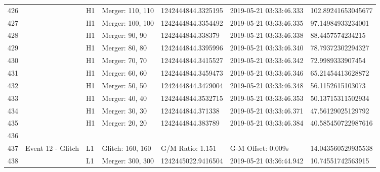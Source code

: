 \begin{longtable}{lllllll}
426  &                                                    &       H1 &  Merger: 110, 110 &  1242444844.3325195 &  2019-05-21 03:33:46.333 &  102.89241653045677 \\
427  &                                                    &       H1 &  Merger: 100, 100 &  1242444844.3354492 &  2019-05-21 03:33:46.335 &   97.14984933234001 \\
428  &                                                    &       H1 &    Merger: 90, 90 &   1242444844.338379 &  2019-05-21 03:33:46.338 &    88.4457574234215 \\
429  &                                                    &       H1 &    Merger: 80, 80 &  1242444844.3395996 &  2019-05-21 03:33:46.340 &   78.79372302294327 \\
430  &                                                    &       H1 &    Merger: 70, 70 &  1242444844.3415527 &  2019-05-21 03:33:46.342 &    72.9989333907454 \\
431  &                                                    &       H1 &    Merger: 60, 60 &  1242444844.3459473 &  2019-05-21 03:33:46.346 &   65.21454413628872 \\
432  &                                                    &       H1 &    Merger: 50, 50 &  1242444844.3479004 &  2019-05-21 03:33:46.348 &    56.1152615103073 \\
433  &                                                    &       H1 &    Merger: 40, 40 &  1242444844.3532715 &  2019-05-21 03:33:46.353 &   50.13715311502934 \\
434  &                                                    &       H1 &    Merger: 30, 30 &   1242444844.371338 &  2019-05-21 03:33:46.371 &   47.56129025129792 \\
435  &                                                    &       H1 &    Merger: 20, 20 &   1242444844.383789 &  2019-05-21 03:33:46.384 &  40.585450722987616 \\
436  &                                                    &          &                   &                     &                          &                     \\
437  &                                  Event 12 - Glitch &       L1 &  Glitch: 160, 160 &    G/M Ratio: 1.151 &       G-M Offset: 0.009s &  14.043560529935538 \\
438  &                                                    &       L1 &  Merger: 300, 300 &  1242445022.9416504 &  2019-05-21 03:36:44.942 &   10.74551742563915 \\

\end{longtable}
